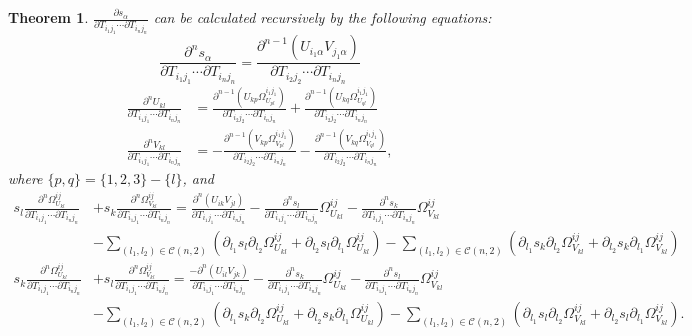 \documentclass[10pt]{article}
\newtheorem{theorem}{Theorem}
\begin{document}
\begin{theorem} \label{thm:dsdTRecursion}
	$\frac{\partial s_{\alpha}}{\partial T_{i_1j_1} \cdots \partial T_{i_nj_n}}$ can be calculated recursively by the following equations:
	\begin{equation}
		\frac{\partial^n s_{\alpha}}{\partial T_{i_1j_1} \cdots \partial T_{i_nj_n}} = \frac{\partial^{n-1} (U_{i_1\alpha}V_{j_1\alpha})}{\partial T_{i_2j_2} \cdots \partial T_{i_nj_n}}
	\end{equation}
	\begin{align}
		\frac{\partial^n U_{kl}}{\partial T_{i_1j_1} \cdots \partial T_{i_nj_n}} &= \frac{\partial^{n-1} \left( U_{kp}\Omega_{U_{pl}}^{i_1j_1} \right)}{\partial T_{i_2j_2} \cdots \partial T_{i_nj_n}} + \frac{\partial^{n-1} \left( U_{kq}\Omega_{U_{ql}}^{i_1j_1} \right)}{\partial T_{i_2j_2} \cdots \partial T_{i_nj_n}} \nonumber \\
		\frac{\partial^n V_{kl}}{\partial T_{i_1j_1} \cdots \partial T_{i_nj_n}} &= -\frac{\partial^{n-1} \left( V_{kp}\Omega_{V_{pl}}^{i_1j_1} \right)}{\partial T_{i_2j_2} \cdots \partial T_{i_nj_n}} - \frac{\partial^{n-1} \left( V_{kq}\Omega_{V_{ql}}^{i_1j_1} \right)}{\partial T_{i_2j_2} \cdots \partial T_{i_nj_n}},
	\end{align}
	where $\{p,q\} = \{1,2,3\}-\{l\}$, and
	\begin{align}
		s_l \frac{\partial^{n} \Omega_{U_{kl}}^{ij}}{\partial T_{i_1j_1} \cdots \partial T_{i_nj_n}} &+ s_k \frac{\partial^{n} \Omega_{V_{kl}}^{ij}}{\partial T_{i_1j_1} \cdots \partial T_{i_nj_n}} = \frac{\partial^n (U_{ik}V_{jl})}{\partial T_{i_1j_1} \cdots \partial T_{i_nj_n}} - \frac{\partial^n s_l}{\partial T_{i_1j_1} \cdots \partial T_{i_nj_n}}\Omega_{U_{kl}}^{ij} - \frac{\partial^n s_k}{\partial T_{i_1j_1} \cdots \partial T_{i_nj_n}}\Omega_{V_{kl}}^{ij} \nonumber \\
		&- \sum_{(l_1,l_2)\in\mathcal{C}(n,2)} \left( \partial_{l_1}s_l\partial_{l_2}\Omega_{U_{kl}}^{ij} + \partial_{l_2}s_l\partial_{l_1}\Omega_{U_{kl}}^{ij} \right) - \sum_{(l_1,l_2)\in\mathcal{C}(n,2)} \left( \partial_{l_1}s_k\partial_{l_2}\Omega_{V_{kl}}^{ij} + \partial_{l_2}s_k\partial_{l_1}\Omega_{V_{kl}}^{ij} \right) \nonumber \\
		s_k \frac{\partial^{n} \Omega_{U_{kl}}^{ij}}{\partial T_{i_1j_1} \cdots \partial T_{i_nj_n}} &+ s_l \frac{\partial^{n} \Omega_{V_{kl}}^{ij}}{\partial T_{i_1j_1} \cdots \partial T_{i_nj_n}} = \frac{-\partial^n (U_{il}V_{jk})}{\partial T_{i_1j_1} \cdots \partial T_{i_nj_n}} - \frac{\partial^n s_k}{\partial T_{i_1j_1} \cdots \partial T_{i_nj_n}}\Omega_{U_{kl}}^{ij} - \frac{\partial^n s_l}{\partial T_{i_1j_1} \cdots \partial T_{i_nj_n}}\Omega_{V_{kl}}^{ij} \nonumber \\
		&- \sum_{(l_1,l_2)\in\mathcal{C}(n,2)} \left( \partial_{l_1}s_k\partial_{l_2}\Omega_{U_{kl}}^{ij} + \partial_{l_2}s_k\partial_{l_1}\Omega_{U_{kl}}^{ij} \right) - \sum_{(l_1,l_2)\in\mathcal{C}(n,2)} \left( \partial_{l_1}s_l\partial_{l_2}\Omega_{V_{kl}}^{ij} + \partial_{l_2}s_l\partial_{l_1}\Omega_{V_{kl}}^{ij} \right).
	\end{align}
\end{theorem}
\end{document}
